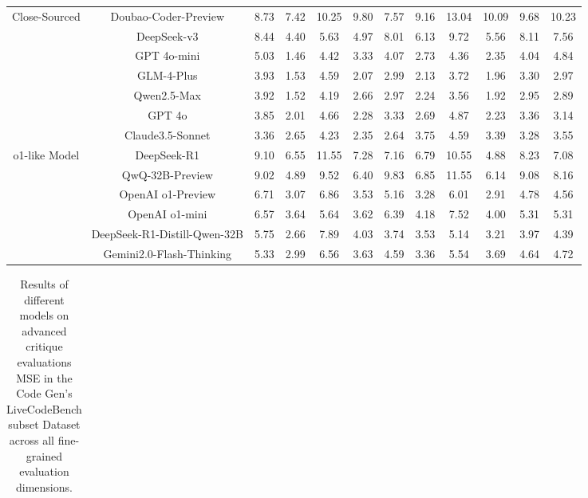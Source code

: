 \documentclass[11pt, a4paper, logo, copyright, nonumbering, amsart]{map}
\begin{document}
\begin{CJK*}{UTF8}{gbsn}
\begin{table*}[h!]
\begin{adjustbox}{width=\textwidth}
\begin{tabular}{c|c|cccccccccc}
    \midrule
    \multirow{7}{*}{Close-Sourced} 
    & Doubao-Coder-Preview & 8.73 & 7.42 & 10.25 & 9.80 & 7.57 & 9.16 & 13.04 & 10.09 & 9.68 & 10.23 \\
    & DeepSeek-v3 & 8.44 & 4.40 & 5.63 & 4.97 & 8.01 & 6.13 & 9.72 & 5.56 & 8.11 & 7.56 \\
    & GPT 4o-mini & 5.03 & 1.46 & 4.42 & 3.33 & 4.07 & 2.73 & 4.36 & 2.35 & 4.04 & 4.84 \\
    & GLM-4-Plus & 3.93 & 1.53 & 4.59 & 2.07 & 2.99 & 2.13 & 3.72 & 1.96 & 3.30 & 2.97 \\
    & Qwen2.5-Max & 3.92 & 1.52 & 4.19 & 2.66 & 2.97 & 2.24 & 3.56 & 1.92 & 2.95 & 2.89 \\
    & GPT 4o & 3.85 & 2.01 & 4.66 & 2.28 & 3.33 & 2.69 & 4.87 & 2.23 & 3.36 & 3.14 \\
    & Claude3.5-Sonnet & 3.36 & 2.65 & 4.23 & 2.35 & 2.64 & 3.75 & 4.59 & 3.39 & 3.28 & 3.55 \\
    
    \midrule
    \multirow{6}{*}{o1-like Model} 
    & DeepSeek-R1 & 9.10 & 6.55 & 11.55 & 7.28 & 7.16 & 6.79 & 10.55 & 4.88 & 8.23 & 7.08 \\
    & QwQ-32B-Preview & 9.02 & 4.89 & 9.52 & 6.40 & 9.83 & 6.85 & 11.55 & 6.14 & 9.08 & 8.16 \\
    & OpenAI o1-Preview & 6.71 & 3.07 & 6.86 & 3.53 & 5.16 & 3.28 & 6.01 & 2.91 & 4.78 & 4.56 \\
    & OpenAI o1-mini & 6.57 & 3.64 & 5.64 & 3.62 & 6.39 & 4.18 & 7.52 & 4.00 & 5.31 & 5.31 \\
    & DeepSeek-R1-Distill-Qwen-32B & 5.75 & 2.66 & 7.89 & 4.03 & 3.74 & 3.53 & 5.14 & 3.21 & 3.97 & 4.39 \\
    & Gemini2.0-Flash-Thinking & 5.33 & 2.99 & 6.56 & 3.63 & 4.59 & 3.36 & 5.54 & 3.69 & 4.64 & 4.72 \\
    \bottomrule
    \end{tabular}
    \end{adjustbox}
\end{table*}

\begin{table*}[h!]
    \centering
    \caption{Results of different models on advanced critique evaluations MSE in the Code Gen's LiveCodeBench subset Dataset across all fine-grained evaluation dimensions.} \label{table:algo_level2_livecodebench_dim}
    \begin{adjustbox}{width=\textwidth}
    \begin{tabular}{c|c|cccccccccc}
    

\end{tabular}
\end{adjustbox}
\end{table*}
\end{CJK*}
\end{document}
